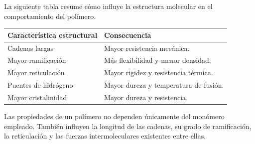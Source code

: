 La siguiente tabla resume cómo influye la estructura molecular en el
comportamiento del polímero.

\begin{center}

\renewcommand{\arraystretch}{1.3}

\begin{tabular}{p{5cm}p{7cm}}

\toprule

\textbf{Característica estructural} &
\textbf{Consecuencia}

\\

\midrule

Cadenas largas

& Mayor resistencia mecánica.

\\

Mayor ramificación

& Más flexibilidad y menor densidad.

\\

Mayor reticulación

& Mayor rigidez y resistencia térmica.

\\

Puentes de hidrógeno

& Mayor dureza y temperatura de fusión.

\\

Mayor cristalinidad

& Mayor dureza y resistencia.

\\

\bottomrule

\end{tabular}

\end{center}


\begin{tcolorbox}[
title=Recuerda,
colback=blue!5,
colframe=blue!70!black]

Las propiedades de un polímero no dependen únicamente del monómero empleado.
También influyen la longitud de las cadenas, su grado de ramificación, la
reticulación y las fuerzas intermoleculares existentes entre ellas.

\end{tcolorbox}


